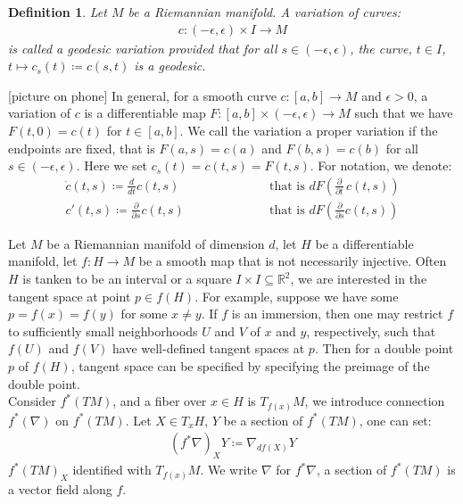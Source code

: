 \documentclass[11pt]{book}
\theoremstyle{break}
\theoremstyle{break}
\newtheorem{defn}{Definition}[corL]
\newcommand{\R}{\mathbb{R}}
\newcommand{\pd}{\partial}
\begin{document}
\begin{defn}
Let $M$ be a Riemannian manifold. A variation of curves:
\begin{align*}
c:(-\epsilon,\epsilon)\times I \to M
\end{align*}
is called a geodesic variation provided that for all $s \in (-\epsilon,\epsilon)$, the curve, $t \in I$, $t\mapsto c_s(t) \coloneqq c(s,t)$ is a geodesic. 
\end{defn}
[picture on phone]
In general, for a smooth curve $c:[a,b] \to M$ and $\epsilon>0$, a variation of $c$ is a differentiable map $F:[a,b] \times (-\epsilon,\epsilon) \to M$ such that we have $F(t,0) = c(t)$ for $t \in [a,b]$. We call the variation a proper variation if the endpoints are fixed, that is $F(a,s) = c(a)$ and $F(b,s) = c(b)$ for all $s \in (-\epsilon,\epsilon)$.  Here we set $c_s(t) = c(t,s) = F(t,s)$. For notation, we denote:
\begin{align*}
\dot{c}(t,s) \coloneqq \frac{d}{dt}c(t,s) \qquad\qquad\qquad &\text{that is } dF\left( \frac{\pd}{\pd t}\, c(t,s)\right)\\ 
c'(t,s) \coloneqq \frac{\pd}{\pd s}c(t,s)\qquad\qquad\qquad &\text{that is } dF\left( \frac{\pd}{\pd s}c(t,s)\right)
\end{align*}

\hfill\break
Let $M$ be a Riemannian manifold of dimension $d$, let $H$ be a differentiable manifold, let $f:H \to M$ be a smooth map that is not necessarily injective. Often $H$ is tanken to be an interval or a square $I \times I \subseteq \R^2$, we are interested in the tangent space at point $p \in f(H)$. For example, suppose we have some $p = f(x) = f(y)$ for some $x\neq y$. If $f$ is an immersion, then one may restrict $f$ to sufficiently small neighborhoods $U$ and $V$ of $x$ and $y$, respectively, such that $f(U)$ and $f(V)$ have well-defined tangent spaces at $p$. Then for a double point $p$ of $f(H)$, tangent space can be specified by specifying the preimage of the double point. \\

Consider $f^*(TM)$, and a fiber over $x \in H$ is $T_{f(x)}M$, we introduce connection $f^*(\nabla)$ on $f^*(TM)$. Let $X \in T_xH$, $Y$ be a section of $f^*(TM)$, one can set:
\begin{align*}
\left( f^* \nabla\right)_X Y \coloneqq  \nabla_{df(X)}Y
\end{align*}
$f^*(TM)_X$ identified with $T_{f(x)}M$. We write $\nabla$ for $f^*\nabla$, a section of $f^*(TM)$ is a vector field along $f$.\\
\end{document}
